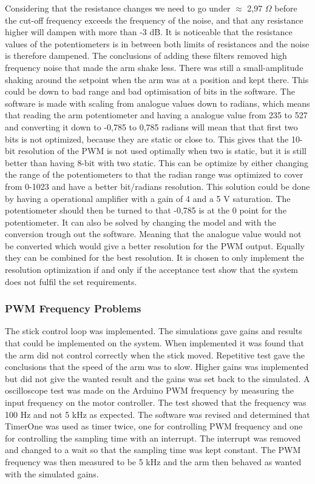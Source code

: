 Considering that the resistance changes we need to go under $\approx$ 2,97 $\Omega$ before the cut-off frequency exceeds the frequency of the noise, and that any resistance higher will dampen with more than -3 dB. It is noticeable that the resistance values of the potentiometers is in between both limits of resistances and the noise is therefore dampened. The conclusions of adding these filters removed high frequency noise that made the arm shake less. There was still a small-amplitude shaking around the setpoint when the arm was at a position and kept there. This could be down to bad range and bad optimisation of bits in the software. The software is made with scaling from analogue values down to radians, which means that reading the arm potentiometer and having a analogue value from 235 to 527 and converting it down to -0,785 to 0,785 radians will mean that that first two bits is not optimized, because they are static or close to. This gives that the 10-bit resolution of the PWM is not used optimally when two is static, but it is still better than having 8-bit with two static. This can be optimize by either changing the range of the potentiometers to that the radian range was optimized to cover from 0-1023 and have a better bit/radians resolution. This solution could be done by having a operational amplifier with a gain of 4 and a 5 V saturation. The potentiometer should then be turned to that -0,785 is at the 0 point for the potentiometer. It can also be solved by changing the model and with the conversion trough out the software. Meaning that the analogue value would not be converted which would give a better resolution for the PWM output. Equally they can be combined for the best resolution. It is chosen to only implement the resolution optimization if and only if the acceptance test show that the system does not fulfil the set requirements.

\subsubsection{PWM Frequency Problems}
The stick control loop was implemented. The simulations gave gains and results that could be implemented on the system. When implemented it was found that the arm did not control correctly when the stick moved. Repetitive test gave the conclusions that the speed of the arm was to slow. Higher gains was implemented but did not give the wanted result and the gains was set back to the simulated. A oscilloscope test was made on the Arduino PWM frequency by measuring the input frequency on the motor controller. The test showed that the frequency was 100 Hz and not 5 kHz as expected. The software was revised and determined that TimerOne was used as timer twice, one for controlling PWM frequency and one for controlling the sampling time with an interrupt. The interrupt was removed and changed to a wait so that the sampling time was kept constant. The PWM frequency was then measured to be 5 kHz and the arm then behaved as wanted with the simulated gains.    

